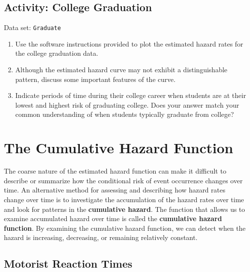 \documentclass[
]{book}
\begin{document}
\hypertarget{activity-college-graduation}{%
\subsection*{Activity: College Graduation}\label{activity-college-graduation}}

Data set: \texttt{Graduate}

\begin{enumerate}
\def\labelenumi{\arabic{enumi}.}
\setcounter{enumi}{44}
\item
  Use the software instructions provided to plot the estimated hazard rates for the college graduation data.
\item
  Although the estimated hazard curve may not exhibit a distinguishable pattern, discuss some important features of the curve.\\
\item
  Indicate periods of time during their college career when students are at their lowest and highest risk of graduating college. Does your answer match your common understanding of when students typically graduate from college?
\end{enumerate}

\hypertarget{the-cumulative-hazard-function}{%
\section{The Cumulative Hazard Function}\label{the-cumulative-hazard-function}}

The coarse nature of the estimated hazard function can make it difficult to describe or summarize how the conditional risk of event occurrence changes over time. An alternative method for assessing and describing how hazard rates change over time is to investigate the accumulation of the hazard rates over time and look for patterns in the \textbf{cumulative hazard}. The function that allows us to examine accumulated hazard over time is called the \textbf{cumulative hazard function}. By examining the cumulative hazard function, we can detect when the hazard is increasing, decreasing, or remaining relatively constant.

\hypertarget{motorist-reaction-times}{%
\subsection*{Motorist Reaction Times}\label{motorist-reaction-times}}
\end{document}

